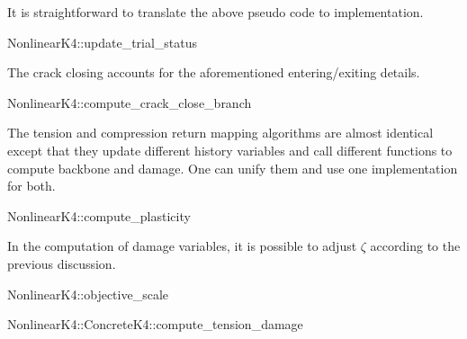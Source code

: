 It is straightforward to translate the above pseudo code to implementation.
\begin{cppcode}
NonlinearK4::update_trial_status
\end{cppcode}

The crack closing accounts for the aforementioned entering/exiting details.
\begin{cppcode}
NonlinearK4::compute_crack_close_branch
\end{cppcode}

The tension and compression return mapping algorithms are almost identical except that they update different history variables and call different functions to compute backbone and damage. One can unify them and use one implementation for both.
\begin{cppcode}
NonlinearK4::compute_plasticity
\end{cppcode}

In the computation of damage variables, it is possible to adjust $\zeta$ according to the previous discussion.
\begin{cppcode}
NonlinearK4::objective_scale
\end{cppcode}

\begin{cppcode}
NonlinearK4::ConcreteK4::compute_tension_damage
\end{cppcode}